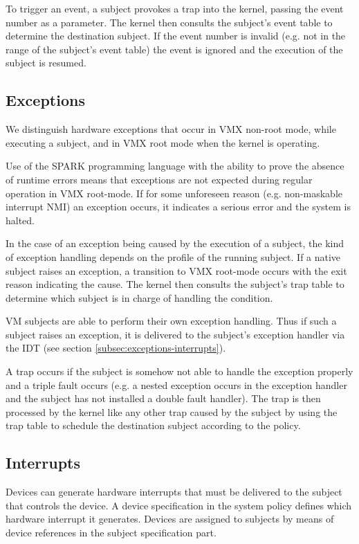 To trigger an event, a subject provokes a trap into the kernel, passing the
event number as a parameter. The kernel then consults the subject's event table
to determine the destination subject. If the event number is invalid (e.g. not
in the range of the subject's event table) the event is ignored and the
execution of the subject is resumed.

\subsection{Exceptions}\label{subsec:design-exceptions}
We distinguish hardware exceptions that occur in VMX non-root
mode, while executing a subject, and in VMX root mode when the kernel is
operating.

Use of the SPARK programming language with the ability to prove the absence of
runtime errors means that exceptions are not expected during regular operation
in VMX root-mode. If for some unforeseen reason (e.g. non-maskable interrupt
NMI) an exception occurs, it indicates a serious error and the system is halted.

In the case of an exception being caused by the execution of a subject, the kind
of exception handling depends on the profile of the running subject. If a native
subject raises an exception, a transition to VMX root-mode occurs with the exit
reason indicating the cause. The kernel then consults the subject's trap table
to determine which subject is in charge of handling the condition.

VM subjects are able to perform their own exception handling. Thus if such a
subject raises an exception, it is delivered to the subject's exception handler
via the IDT (see section \ref{subsec:exceptions-interrupts}).

A trap occurs if the subject is somehow not able to handle the exception
properly and a triple fault occurs (e.g. a nested exception occurs in the
exception handler and the subject has not installed a double fault handler).
The trap is then processed by the kernel like any other trap caused by the
subject by using the trap table to schedule the destination subject according to
the policy.

\subsection{Interrupts}
Devices can generate hardware interrupts that must be
delivered to the subject that controls the device. A device specification in
the system policy defines which hardware interrupt it generates. Devices are
assigned to subjects by means of device references in the subject specification
part.

